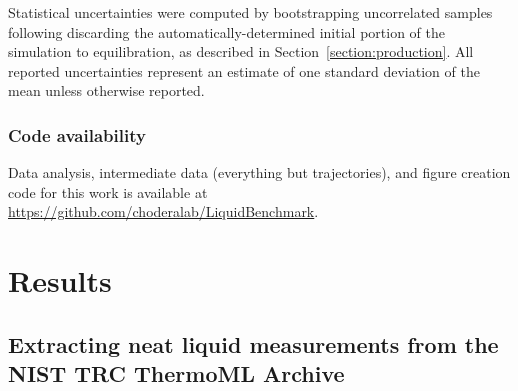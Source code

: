 \documentclass[aps,pre,twocolumn,nofootinbib,superscriptaddress,linenumbers]{revtex4-1}
\begin{document}
Statistical uncertainties were computed by bootstrapping uncorrelated samples following discarding the automatically-determined initial portion of the simulation to equilibration, as described in Section~\ref{section:production}.
All reported uncertainties represent an estimate of one standard deviation of the mean unless otherwise reported.

\subsubsection{Code availability}

Data analysis, intermediate data (everything but trajectories), and figure creation code for this work is available at \url{https://github.com/choderalab/LiquidBenchmark}.  


\section{Results}

\subsection{Extracting neat liquid measurements from the NIST TRC ThermoML Archive}
\label{section:filtering-thermoml}
\end{document}
